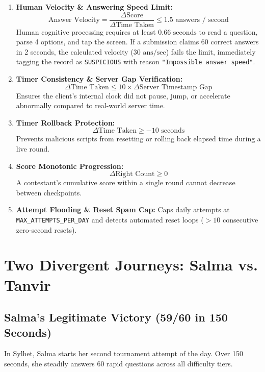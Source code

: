 \begin{enumerate}
    \item \textbf{Human Velocity \& Answering Speed Limit:}
    $$\text{Answer Velocity} = \frac{\Delta \text{Score}}{\Delta \text{Time Taken}} \le 1.5 \text{ answers / second}$$
    Human cognitive processing requires at least $0.66\text{ seconds}$ to read a question, parse 4 options, and tap the screen. If a submission claims 60 correct answers in 2 seconds, the calculated velocity ($30\text{ ans/sec}$) fails the limit, immediately tagging the record as \texttt{SUSPICIOUS} with reason \texttt{"Impossible answer speed"}.
    
    \item \textbf{Timer Consistency \& Server Gap Verification:}
    $$\Delta \text{Time Taken} \le 10 \times \Delta \text{Server Timestamp Gap}$$
    Ensures the client's internal clock did not pause, jump, or accelerate abnormally compared to real-world server time.
    
    \item \textbf{Timer Rollback Protection:}
    $$\Delta \text{Time Taken} \ge -10\text{ seconds}$$
    Prevents malicious scripts from resetting or rolling back elapsed time during a live round.
    
    \item \textbf{Score Monotonic Progression:}
    $$\Delta \text{Right Count} \ge 0$$
    A contestant's cumulative score within a single round cannot decrease between checkpoints.
    
    \item \textbf{Attempt Flooding \& Reset Spam Cap:}
    Caps daily attempts at \texttt{MAX\_ATTEMPTS\_PER\_DAY} and detects automated reset loops ($>10$ consecutive zero-second resets).
\end{enumerate}

\section{Two Divergent Journeys: Salma vs. Tanvir}

\subsection{Salma's Legitimate Victory (59/60 in 150 Seconds)}
In Sylhet, Salma starts her second tournament attempt of the day. Over 150 seconds, she steadily answers 60 rapid questions across all difficulty tiers.

